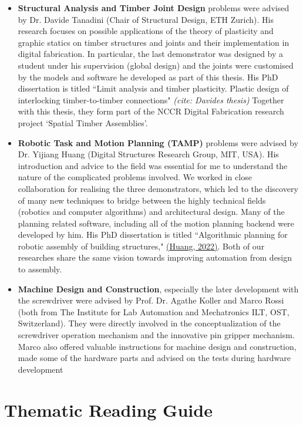 \documentclass[11pt]{book}
\begin{document}
\begin{itemize}
	\item \textbf{Structural Analysis and Timber Joint Design }problems were advised by Dr. Davide Tanadini (Chair of Structural Design, ETH Zurich). His research focuses on possible applications of the theory of plasticity and graphic statics on timber structures and joints and their implementation in digital fabrication. In particular, the last demonstrator was designed by a student under his supervision (global design) and the joints were customised by the models and software he developed as part of this thesis. His PhD dissertation is titled ``Limit analysis and timber plasticity. Plastic design of interlocking timber-to-timber connections" \textit{(cite: Davides thesis) }Together with this thesis, they form part of the NCCR Digital Fabrication research project ‘Spatial Timber Assemblies’.

	\item \textbf{Robotic Task and Motion Planning (TAMP) }problems were advised by Dr. Yijiang Huang (Digital Structures Research Group, MIT, USA). His introduction and advice to the field was essential for me to understand the nature of the complicated problems involved. We worked in close collaboration for realising the three demonstrators, which led to the discovery of many new techniques to bridge between the highly technical fields (robotics and computer algorithms) and architectural design. Many of the planning related software, including all of the motion planning backend were developed by him. His PhD dissertation is titled ``Algorithmic planning for robotic assembly of building structures," \href{https://www.zotero.org/google-docs/?GiBuSm}{(Huang, 2022)}. Both of our researches share the same vision towards improving automation from design to assembly. 

	\item \textbf{Machine Design and Construction}, especially the later development with the screwdriver were advised by Prof. Dr. Agathe Koller and Marco Rossi (both from The Institute for Lab Automation and Mechatronics ILT, OST, Switzerland). They were directly involved in the conceptualization of the screwdriver operation mechanism and the innovative pin gripper mechanism. Marco also offered valuable instructions for machine design and construction, made some of the hardware parts and advised on the tests during hardware development

\end{itemize}
\section{Thematic Reading Guide}
\end{document}
